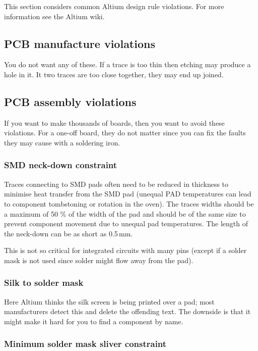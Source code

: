 This section considers common Altium design rule violations.  For more
information see the Altium wiki.



\subsection{PCB manufacture violations}

You do not want any of these.  If a trace is too thin then etching may
produce a hole in it.  It two traces are too close together, they may
end up joined.


\subsection{PCB assembly violations}

If you want to make thousands of boards, then you want to avoid these
violations.  For a one-off board, they do not matter since you can fix
the faults they may cause with a soldering iron.

\subsubsection{SMD neck-down constraint}

Traces connecting to SMD pads often need to be reduced in thickness to
minimise heat transfer from the SMD pad (unequal PAD temperatures can
lead to component tombstoning or rotation in the oven).  The traces
widths should be a maximum of 50 \% of the width of the pad and should
be of the same size to prevent component movement due to unequal pad
temperatures.  The length of the neck-down can be as short as 0.5\,mm.

This is not so critical for integrated circuits with many pins (except
if a solder mask is not used since solder might flow away from the
pad).


\subsubsection{Silk to solder mask}

Here Altium thinks the silk screen is being printed over a pad; most
manufacturers detect this and delete the offending text.  The downside
is that it might make it hard for you to find a component by name.


\subsubsection{Minimum solder mask sliver constraint}

